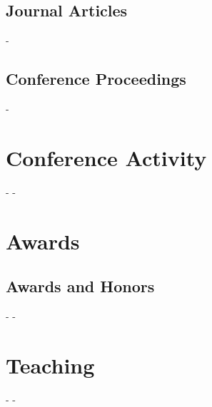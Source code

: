 \documentclass[12pt,letterpaper]{report}
\begin{document}
    \subsection*{Journal Articles}
    \begin{tablist}
        \item[-] \tab{}\fullcite{-}
    \end{tablist}

    \subsection*{Conference Proceedings}
    \begin{tablist}
        \item[-] \tab{}\fullcite{-}
    \end{tablist}


    \section*{Conference Activity}
    \begin{tablist}
        \item[-] \tab{}-
    \end{tablist}

    \section*{Awards}
    \subsection*{Awards and Honors}
    \begin{tablist}
        \item[-] \tab{}-
    \end{tablist}

    \section*{Teaching}
    \begin{tablist}
        \item[-] \tab{}-
    \end{tablist}
\end{document}
